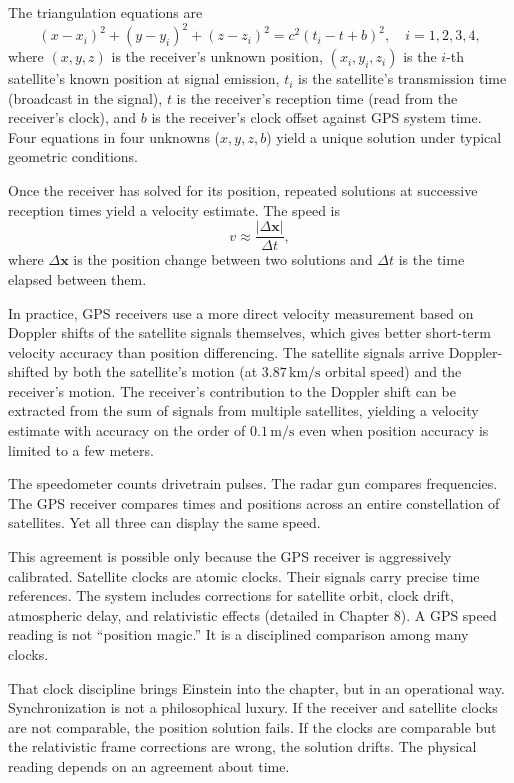 The triangulation equations are
\[
(x - x_i)^2 + (y - y_i)^2 + (z - z_i)^2 = c^2 (t_i - t + b)^2,
\quad i = 1, 2, 3, 4,
\]
where $(x, y, z)$ is the receiver's unknown position, $(x_i, y_i, z_i)$ is
the $i$-th satellite's known position at signal emission, $t_i$ is the
satellite's transmission time (broadcast in the signal), $t$ is the
receiver's reception time (read from the receiver's clock), and $b$ is
the receiver's clock offset against GPS system time. Four equations in
four unknowns ($x, y, z, b$) yield a unique solution under typical
geometric conditions.

Once the receiver has solved for its position, repeated solutions at
successive reception times yield a velocity estimate. The speed is
\[
v \approx \frac{|\Delta \mathbf{x}|}{\Delta t},
\]
where $\Delta \mathbf{x}$ is the position change between two solutions
and $\Delta t$ is the time elapsed between them.

In practice, GPS receivers use a more direct velocity measurement based
on Doppler shifts of the satellite signals themselves, which gives
better short-term velocity accuracy than position differencing. The
satellite signals arrive Doppler-shifted by both the satellite's motion
(at $3{.}87\,\mathrm{km/s}$ orbital speed) and the receiver's motion. The
receiver's contribution to the Doppler shift can be extracted from the
sum of signals from multiple satellites, yielding a velocity estimate
with accuracy on the order of $0{.}1\,\mathrm{m/s}$ even when position
accuracy is limited to a few meters.

The speedometer counts drivetrain pulses. The radar gun compares
frequencies. The GPS receiver compares times and positions across an
entire constellation of satellites. Yet all three can display the same
speed.

This agreement is possible only because the GPS receiver is aggressively
calibrated. Satellite clocks are atomic clocks. Their signals carry precise
time references. The system includes corrections for satellite orbit, clock
drift, atmospheric delay, and relativistic effects (detailed in Chapter 8).
A GPS speed reading is not ``position magic.'' It is a disciplined comparison
among many clocks.

That clock discipline brings Einstein into the chapter, but in an operational
way. Synchronization is not a philosophical luxury. If the receiver and
satellite clocks are not comparable, the position solution fails. If the clocks
are comparable but the relativistic frame corrections are wrong, the solution
drifts. The physical reading depends on an agreement about time.

